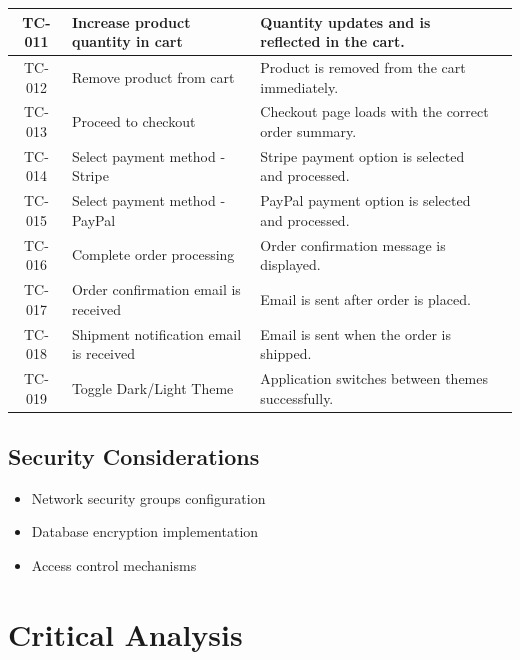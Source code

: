 \documentclass{llncs}
\begin{document}
\begin{longtable}{|c|p{4.5cm}|p{4.5cm}|c|}
    TC-011                & Increase product quantity in cart          & Quantity updates and is reflected in the cart.            &                             \\ \hline
    TC-012                & Remove product from cart                   & Product is removed from the cart immediately.             &                             \\ \hline
    TC-013                & Proceed to checkout                        & Checkout page loads with the correct order summary.       &                             \\ \hline
    TC-014                & Select payment method - Stripe             & Stripe payment option is selected and processed.          &                             \\ \hline
    TC-015                & Select payment method - PayPal             & PayPal payment option is selected and processed.          &                             \\ \hline
    TC-016                & Complete order processing                  & Order confirmation message is displayed.                  &                             \\ \hline
    TC-017                & Order confirmation email is received       & Email is sent after order is placed.                      &                             \\ \hline
    TC-018                & Shipment notification email is received    & Email is sent when the order is shipped.                  &                             \\ \hline
    TC-019                & Toggle Dark/Light Theme                    & Application switches between themes successfully.         &                             \\ \hline
\end{longtable}

\subsection{Security Considerations}
\begin{itemize}
    \item Network security groups configuration
    \item Database encryption implementation
    \item Access control mechanisms
\end{itemize}

\section{Critical Analysis}
\end{document}
